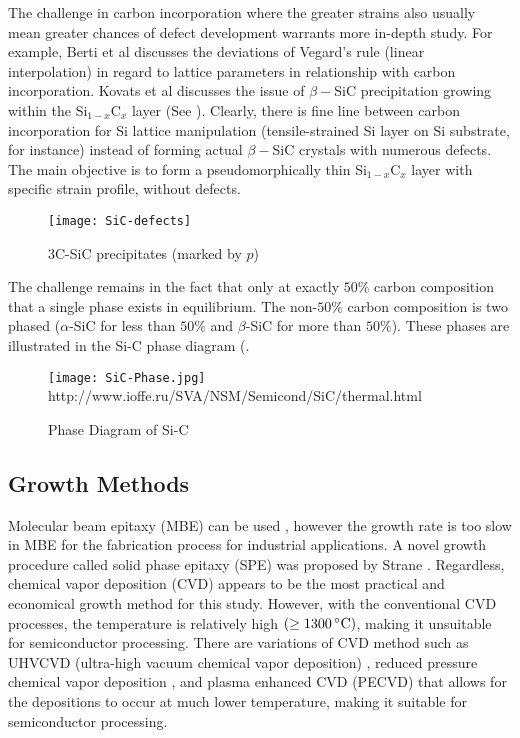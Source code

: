 The challenge in carbon incorporation where the greater strains also usually mean greater chances of defect development warrants more in-depth study.  For example, Berti et al \cite{Berti1} discusses the deviations of Vegard's rule (linear interpolation) in regard to lattice parameters in relationship with carbon incorporation.  Kovats et al  \cite{Kovats1} discusses the issue of $\beta-$SiC precipitation growing within the Si$_{1-x}$C$_x$ layer (See ).  Clearly, there is fine line between carbon incorporation for Si lattice manipulation (tensile-strained Si layer on Si substrate, for instance) instead of forming actual $\beta-$SiC crystals with numerous defects.  The main objective is to form a pseudomorphically thin Si$_{1-x}$C$_x$ layer with specific strain profile, without defects.

\begin{figure}[h]
\centering
\caption{3C-SiC precipitates (marked by $p$) \cite{Lindner1}}
\label{SiC-defect}
\texttt{[image: SiC-defects]}
\end{figure}

The challenge remains in the fact that only at exactly $50\%$ carbon composition that a single phase exists in equilibrium.  The non-$50\%$ carbon composition is two phased ($\alpha$-SiC for less than $50\%$ and $\beta$-SiC for more than $50\%$).  These phases are illustrated in the Si-C phase diagram (.
\begin{figure}[h]
\caption{Phase Diagram of Si-C}
\label{SiC-Phase}
\centering
\texttt{[image: SiC-Phase.jpg]}
{http://www.ioffe.ru/SVA/NSM/Semicond/SiC/thermal.html}
\end{figure}

\subsection{Growth Methods}

Molecular beam epitaxy (MBE) can be used \cite{Eberl1,Fissel1}, however the growth rate is too slow in MBE for the fabrication process for industrial applications.  A novel growth procedure called solid phase epitaxy (SPE) was proposed by Strane \cite{Kramer1,Strane1}.  Regardless, chemical vapor deposition (CVD) appears to be the most practical and economical growth method for this study. However, with the conventional CVD processes, the temperature is relatively high $(\geq 1300\,^{\circ}\mathrm{C})$, making it unsuitable for semiconductor processing.   There are variations of CVD method such as  UHVCVD (ultra-high vacuum chemical vapor deposition) \cite{Calmes1}, reduced pressure chemical vapor deposition \cite{Hartmann1,Hartmann2}, and plasma enhanced CVD (PECVD) \cite{Ambrosone1,Coscia1,Coscia2,Coscia3,Basa1,Tong1,Ambrosone2,Ambrosone3,Ambrosone4,Basa3} that allows for the depositions to occur at much lower temperature, making it suitable for semiconductor processing.

